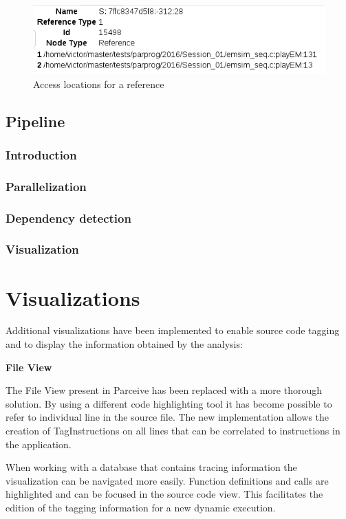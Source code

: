 \begin{figure}
	\centering
	\includegraphics[width=1\textwidth]{section-detail}
	\caption{Access locations for a reference}
	\label{cap3:sec:detail}
\end{figure}

\subsection{Pipeline}
\subsubsection{Introduction}
\subsubsection{Parallelization}
\subsubsection{Dependency detection}
\subsubsection{Visualization}

\section{Visualizations}

Additional visualizations have been implemented to enable source code tagging and to display the information obtained by the analysis:

\textbf{File View}

The File View present in Parceive has been replaced with a more thorough solution. By using a different code highlighting tool \cite{googleprettify} it has become possible to refer to individual line in the source file. The new implementation allows the creation of TagInstructions on all lines that can be correlated to instructions in the application.

When working with a database that contains tracing information the visualization can be navigated more easily. Function definitions and calls are highlighted and can be focused in the source code view. This facilitates the edition of the tagging information for a new dynamic execution.


